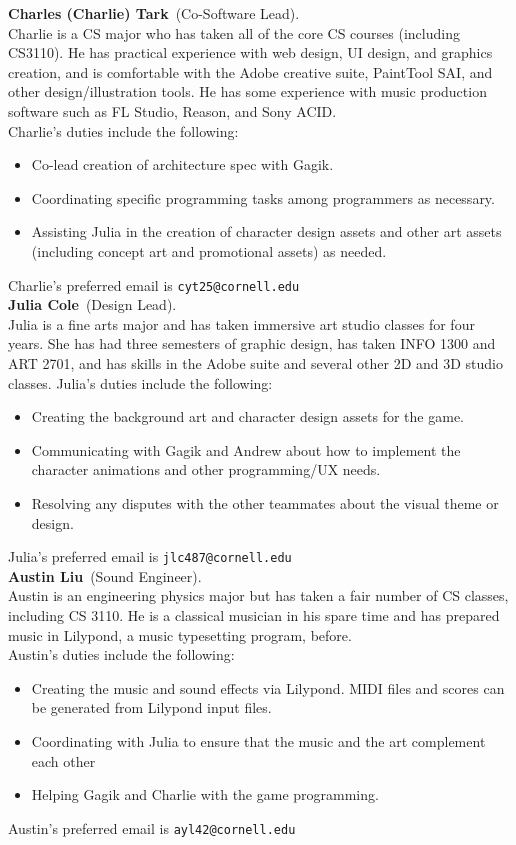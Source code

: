 \documentclass[letterpaper,11pt]{texMemo}
\newcommand{\teammember}[2]{ \textbf{#1}\ (#2).\ }
\newenvironment{duties}[1]
               {
                 #1's duties include the following:
                 \begin{itemize}
               }
               {
                 \end{itemize}
               }
\newcommand{\preferredemail}[2]{#1's preferred email is \texttt{#2}\\}
\begin{document}
\teammember{Charles (Charlie) Tark}{Co-Software Lead}\\
Charlie is a CS major who has taken all of the core CS courses 
(including CS3110).  He has practical experience with web design, UI design, 
and graphics creation, and is comfortable with the Adobe creative suite, 
PaintTool SAI, and other design/illustration tools.  He has some experience 
with music production software such as FL Studio, Reason, and Sony ACID.\\
\begin{duties}{Charlie}
\item{Co-lead creation of architecture spec with Gagik}.
\item{Coordinating specific programming tasks among programmers as necessary.}
\item{Assisting Julia in the creation of  character design assets and other 
art assets (including concept art and promotional assets) as needed.}
\end{duties}
\preferredemail{Charlie}{cyt25@cornell.edu}

\teammember{Julia Cole}{Design Lead}\\Julia is a fine arts major and has taken 
immersive art studio classes for four years. She has had three semesters of 
graphic design, has taken INFO 1300 and ART 2701, and has skills in the 
Adobe suite and several other 2D and 3D studio classes.
\begin{duties}{Julia}
\item{Creating the background art and character design assets for the game.}
\item{Communicating with Gagik and Andrew about how to implement the character animations and other programming/UX needs.}
\item{Resolving any disputes with the other teammates about the visual theme or design.}
\end{duties}
\preferredemail{Julia}{jlc487@cornell.edu}

\teammember{Austin Liu}{Sound Engineer}\\
Austin is an engineering physics major but has taken a fair number of CS 
classes, including CS 3110. He is a classical
musician in his spare time and has prepared music in Lilypond, a music
typesetting program, before. \\
\begin{duties}{Austin}
\item Creating the music and sound effects via Lilypond.
  MIDI files and scores can be generated from Lilypond input files.
\item Coordinating with Julia to ensure that the music and the art complement
  each other
\item Helping Gagik and Charlie with the game programming.
\end{duties}
\preferredemail{Austin}{ayl42@cornell.edu}
\end{document}
